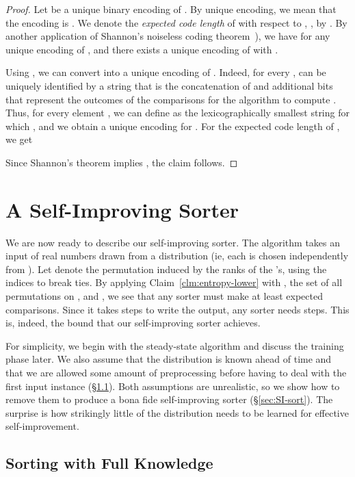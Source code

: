 \documentclass{siamltex}
\begin{document}
\begin{proof}
Let  be a unique binary encoding of 
. By unique encoding, we mean that the encoding is . We denote the \emph{expected code length} of  with
respect to , , by .
By another application of Shannon's noiseless coding 
theorem~\cite[Theorem 5.4.1]{CoverTh06}), 
we have  for any unique encoding  of , and there 
exists a unique encoding  of  with . 

Using , 
we can  convert  into a unique encoding  of . Indeed, 
for every ,  can be uniquely identified by a string
 that is the concatenation of
 and additional bits that represent the 
outcomes of the comparisons for the algorithm to compute . 
Thus, for every element , we can define 
as the lexicographically smallest string  for which , and
we obtain a unique encoding  for . For the  expected code length
 of , we get

Since Shannon's theorem implies , 
the claim follows.
\end{proof}


\section{A Self-Improving Sorter}\label{sec:sorter}

We are now ready to describe our self-improving sorter. 
The algorithm takes an 
input  of real numbers drawn from
a distribution  (ie, each  is chosen
independently from ).
Let  denote the permutation induced by the ranks of the 's,
using the indices  to break ties.
By applying Claim~\ref{clm:entropy-lower} with , 
the set of all permutations on , and
,  we see 
that any sorter must make at least  
expected comparisons. Since it takes  steps to
write the output, any sorter needs  steps.
This is, indeed, the bound that our self-improving sorter achieves.

For simplicity, we begin with the steady-state algorithm
and discuss the training phase later.
We also assume that the distribution 
is known ahead of time and that we are allowed some amount of preprocessing
before having to deal with the first input instance 
(\S\ref{sec:preprocessing-sort}).
Both assumptions are unrealistic, so we show how to remove them
to produce a bona fide self-improving sorter (\S \ref{sec:SI-sort}).
The surprise is how strikingly little of the distribution needs to be learned
for effective self-improvement.

\subsection{Sorting with Full Knowledge}\label{sec:preprocessing-sort}
\end{document}

